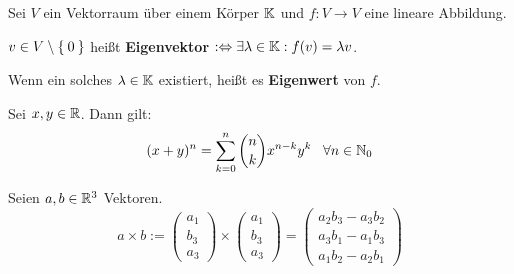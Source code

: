 \begin{definition}%
	Sei $V$ ein Vektorraum über einem Körper $\mathbb{K}$ und $f: V \rightarrow V$ eine 
	lineare Abbildung.

	$v \in V \setminus \Set{0}$ heißt \textbf{Eigenvektor} $:\Leftrightarrow \exists \lambda \in \mathbb{K}: f(v) = \lambda v$.

	Wenn ein solches $\lambda \in \mathbb{K}$ existiert, heißt es \textbf{Eigenwert} von $f$.
\end{definition}

\begin{satz*}%
	Sei $x, y \in \mathbb{R}$. Dann gilt:
	\[(x+y)^n = \sum_{k=0}^{n}\binom{n}{k} x^{n-k}y^{k} \;\;\; \forall n \in \mathbb{N}_0\]
\end{satz*}

\begin{definition}
	Seien $a, b \in \mathbb{R}^3$ Vektoren.
	\[ a \times b := \begin{pmatrix}a_1\\b_3\\a_3 \end{pmatrix} \times \begin{pmatrix}a_1\\b_3\\a_3 \end{pmatrix} = \begin{pmatrix}a_2 b_3 - a_3 b_2\\a_3 b_1 - a_1 b_3\\a_1 b_2 - a_2 b_1 \end{pmatrix}\]
\end{definition}
